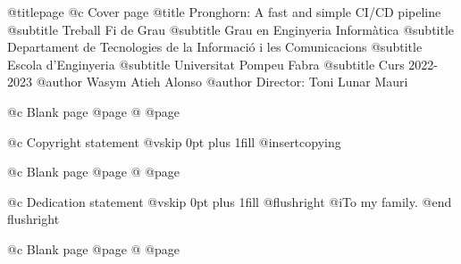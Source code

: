 @titlepage
@c Cover page
@title Pronghorn: A fast and simple CI/CD pipeline
@subtitle Treball Fi de Grau
@subtitle Grau en Enginyeria Informàtica
@subtitle Departament de Tecnologies de la Informació i les Comunicacions
@subtitle Escola d'Enginyeria
@subtitle Universitat Pompeu Fabra
@subtitle Curs 2022-2023
@author Wasym Atieh Alonso
@author Director: Toni Lunar Mauri

@c Blank page
@page
@
@page

@c Copyright statement
@vskip 0pt plus 1fill
@insertcopying

@c Blank page
@page
@
@page

@c Dedication statement
@vskip 0pt plus 1fill
@flushright
@i{To my family.}
@end flushright

@c Blank page
@page
@
@page
